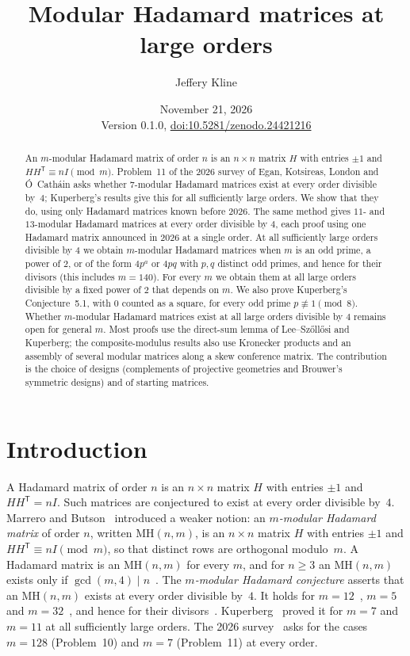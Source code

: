 \documentclass[10pt]{article}
\title{Modular Hadamard matrices at large orders}
\author{Jeffery Kline}
\date{November 21, 2026\\[3pt]\small Version 0.1.0, \href{https://doi.org/10.5281/zenodo.24421216}{doi:10.5281/zenodo.24421216}}
\theoremstyle{remark}
\newcommand{\MH}{\mathrm{MH}}
\newcommand{\tr}{^{\mathsf T}}
\begin{document}
\maketitle

\begin{abstract}
An $m$-modular Hadamard matrix of order $n$ is an $n\times n$ matrix $H$ with entries $\pm1$ and $HH^{\mathsf T}\equiv nI \pmod m$. Problem~11 of the 2026 survey of Egan, Kotsireas, London and \'O~Cath\'ain asks whether $7$-modular Hadamard matrices exist at every order divisible by~$4$; Kuperberg's results give this for all sufficiently large orders. We show that they do, using only Hadamard matrices known before 2026. The same method gives $11$- and $13$-modular Hadamard matrices at every order divisible by $4$, each proof using one Hadamard matrix announced in 2026 at a single order. At all sufficiently large orders divisible by $4$ we obtain $m$-modular Hadamard matrices when $m$ is an odd prime, a power of $2$, or of the form $4p^a$ or $4pq$ with $p,q$ distinct odd primes, and hence for their divisors (this includes $m=140$). For every $m$ we obtain them at all large orders divisible by a fixed power of $2$ that depends on $m$. We also prove Kuperberg's Conjecture~5.1, with $0$ counted as a square, for every odd prime $p\not\equiv1\pmod 8$. Whether $m$-modular Hadamard matrices exist at all large orders divisible by $4$ remains open for general $m$. Most proofs use the direct-sum lemma of Lee--Sz\H{o}ll\H{o}si and Kuperberg; the composite-modulus results also use Kronecker products and an assembly of several modular matrices along a skew conference matrix. The contribution is the choice of designs (complements of projective geometries and Brouwer's symmetric designs) and of starting matrices.
\end{abstract}

\section{Introduction}\label{sec:intro}
A Hadamard matrix of order $n$ is an $n\times n$ matrix $H$ with entries $\pm1$ and $HH\tr=nI$. Such matrices are conjectured to exist at every order divisible by~$4$. Marrero and Butson~\cite{MB72,MB73} introduced a weaker notion: an \emph{$m$-modular Hadamard matrix} of order $n$, written $\MH(n,m)$, is an $n\times n$ matrix $H$ with entries $\pm1$ and $HH\tr\equiv nI\pmod m$, so that distinct rows are orthogonal modulo~$m$. A Hadamard matrix is an $\MH(n,m)$ for every $m$, and for $n\ge3$ an $\MH(n,m)$ exists only if $\gcd(m,4)\mid n$~\cite[Lemma~2.1]{K}. The \emph{$m$-modular Hadamard conjecture} asserts that an $\MH(n,m)$ exists at every order divisible by~$4$. It holds for $m=12$~\cite{MB72,MB73}, $m=5$~\cite{LS} and $m=32$~\cite{EK01}, and hence for their divisors~\cite{EK05,E26}. Kuperberg~\cite{K} proved it for $m=7$ and $m=11$ at all sufficiently large orders. The 2026 survey~\cite[\S5.4]{EKLO} asks for the cases $m=128$ (Problem~10) and $m=7$ (Problem~11) at every order.
\end{document}
